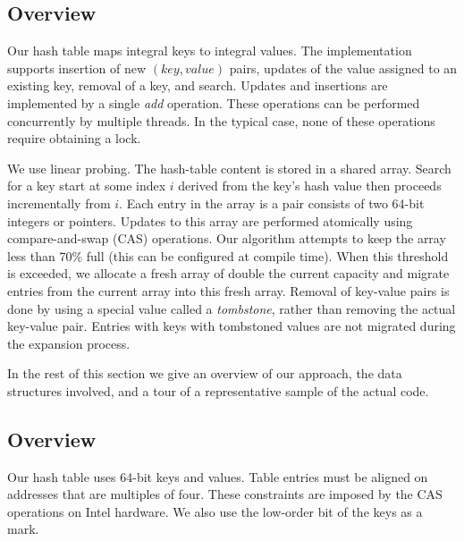 
\subsection{Overview}

Our hash table maps integral keys to integral values. The
implementation supports insertion of new $(key,value)$ pairs, updates
of the value assigned to an existing key, removal of a key, and
search. Updates and insertions are implemented by a single {\em add\/}
operation. These operations can be performed concurrently by multiple
threads. In the typical case, none of these operations require
obtaining a lock.

We use linear probing. The hash-table content is stored in a shared
array. Search for a key start at some index $i$ derived from the key's
hash value then proceeds incrementally from $i$.  Each entry in the
array is a pair consists of two 64-bit integers or pointers. Updates
to this array are performed atomically using compare-and-swap (CAS)
operations. Our algorithm attempts to keep the array less than 70\%
full (this can be configured at compile time). When this threshold is
exceeded, we allocate a fresh array of double the current capacity and
migrate entries from the current array into this fresh array. Removal
of key-value pairs is done by using a special value called a {\em
  tombstone\/}, rather than removing the actual key-value pair.
Entries with keys with tombstoned values are not migrated during the
expansion process.

In the rest of this section we give an overview of our approach, the
data structures involved, and a tour of a representative sample of the
actual code.


\subsection{Overview}

Our hash table uses 64-bit keys and values. Table entries must be
aligned on addresses that are multiples of four. These constraints are
imposed by the CAS operations on Intel hardware. We also use the low-order
bit of the keys as a mark.

